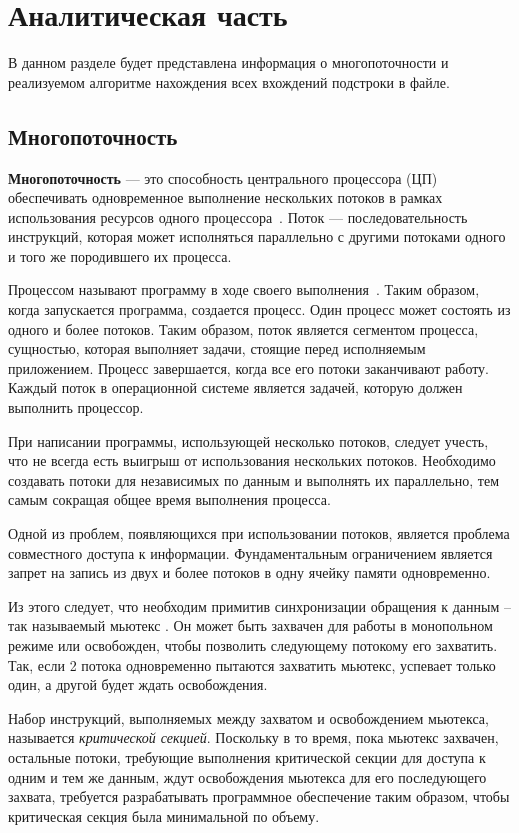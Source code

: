 \chapter{Аналитическая часть}
В данном разделе будет представлена информация о многопоточности и реализуемом алгоритме нахождения всех вхождений подстроки в файле.

\section{Многопоточность}

\textbf{Многопоточность}  --- это способность центрального процессора (ЦП) обеспечивать одновременное выполнение нескольких потоков в рамках использования ресурсов одного процессора~\cite{multithreading}.
Поток --- последовательность инструкций, которая может исполняться параллельно с другими потоками одного и того же породившего их процесса.

Процессом называют программу в ходе своего выполнения~\cite{process}.
Таким образом, когда запускается программа, создается процесс.
Один процесс может состоять из одного и более потоков.
Таким образом, поток является сегментом процесса, сущностью, которая выполняет задачи, стоящие перед исполняемым приложением.
Процесс завершается, когда все его потоки заканчивают работу.
Каждый поток в операционной системе является задачей, которую должен выполнить процессор.

При написании программы, использующей несколько потоков, следует учесть, что не всегда есть выигрыш от использования нескольких потоков.
Необходимо создавать потоки для независимых по данным и выполнять их параллельно, тем самым сокращая общее время выполнения процесса.

Одной из проблем, появляющихся при использовании потоков, является проблема совместного доступа к информации.
Фундаментальным ограничением является запрет на запись из двух и более потоков в одну ячейку памяти одновременно.

Из этого следует, что необходим примитив синхронизации обращения к данным -- так называемый мьютекс .
Он может быть захвачен для работы в монопольном режиме или освобожден, чтобы позволить следующему потокому его захватить.
Так, если 2 потока одновременно пытаются захватить мьютекс, успевает только один, а другой будет ждать освобождения.

Набор инструкций, выполняемых между захватом и освобождением мьютекса, называется \textit{критической секцией}.
Поскольку в то время, пока мьютекс захвачен, остальные потоки, требующие выполнения критической секции для доступа к одним и тем же данным, ждут освобождения мьютекса для его последующего захвата, требуется разрабатывать программное обеспечение таким образом, чтобы критическая секция была минимальной по объему.

